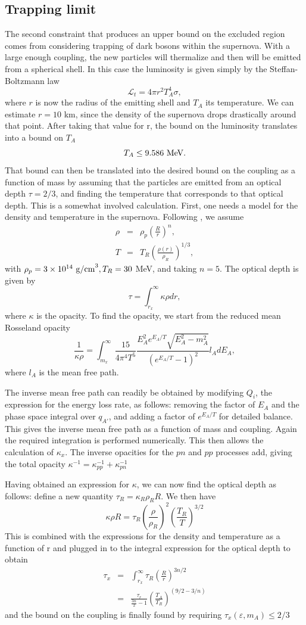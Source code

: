 \documentclass[nofootinbib,prd,superscriptaddress,twocolumn]{revtex4}
\newcommand{\beq}{\begin{equation}}
\newcommand{\eeq}{\end{equation}}
\newcommand{\bea}{\begin{eqnarray}}
\newcommand{\eea}{\end{eqnarray}}
\newcommand{\qa}{q_{A'}}
\begin{document}
\subsection{Trapping limit}
The second constraint that produces an upper bound on the excluded region comes from considering trapping of dark bosons within the supernova. With a large enough coupling, the new particles will thermalize and then will be emitted from a spherical shell.  In this case the luminosity is given simply by the Steffan-Boltzmann law
\beq
\mathcal{L}_t  = 4\pi r^2 T_A^4 \sigma,
\eeq
where $ r $ is now the radius of the emitting shell and $ T_A $ its temperature. We can estimate $ r = 10$ km, since the density of the supernova drops drastically around that point. After taking that value for r, the bound on the luminosity translates into a bound on $ T_A $ 
\beq
T_A \le 9.586\rm\ MeV.
\eeq
That bound can then be translated into the desired bound on the coupling as a function of mass by assuming that the particles are emitted from an optical depth $ \tau = 2/3 $, and finding the temperature that corresponds to that optical depth. This is a somewhat involved calculation.
First, one needs a model for the density and temperature in the supernova. Following \cite{dent_etal12}, we assume 
\bea
\rho &=& \rho_p \left(\frac{R}{r}\right)^n,\\
T &=& T_R \left(\frac{\rho(r)}{\rho_R}\right)^{1/3},
\eea
with $  \rho_p  = 3\times10^{14}\ {\rm g/cm}^3, T_R = 30$ MeV, and taking $ n = 5 $. The optical depth is given by 
\beq
\tau = \int_{r_x}^{\infty} \kappa \rho dr,
\eeq
where $ \kappa$ is the opacity.  To find the opacity, we start from the reduced mean Rosseland opacity 
\beq
\frac{1}{\kappa \rho} = \int_{m_x}^{\infty} \frac{15}{4 \pi^4 T^5} \frac{E_A^2 e^{E_A/T} \sqrt{E_A^2 - m_A^2}}{(e^{E_A/T}-1)^2} l_A dE_A,
\eeq
where $ l_A $ is the mean free path. 
	
The inverse mean free path can readily be obtained by modifying $ Q_i $, the expression for the energy loss rate, as follows: removing the factor of $ E_A $ and the phase space integral over $ \qa $, and adding a factor of $ e^{E_A/T} $ for detailed balance. This gives the inverse mean free path as a function of mass and coupling. Again the required integration is performed numerically. This then allows the calculation of $ \kappa_x $. The inverse opacities for the $pn$ and $pp$ processes add, giving the total opacity $ \kappa^{-1} = \kappa_{pp}^{-1} + \kappa_{pn}^{-1} $
	
Having obtained an expression for $ \kappa $, we can now find the optical depth as follows: define a new quantity $ \tau_R = \kappa_R \rho_R R $. We then have 
\beq \kappa \rho R = \tau_R (\frac{\rho}{\rho_R})^2 (\frac{T_R}{T})^{3/2}  \eeq
This is combined with the expressions for the density and temperature as a function of r and plugged in to the integral expression for the optical depth to obtain 
\bea \tau_x &=& \int_{r_x}^{\infty} \tau_R (\frac{R}{r})^{3n/2} \\
 &=& \frac{\tau_r}{\frac{3n}{2}-1} (\frac{T_A}{T_R})^{(9/2-3/n)} \eea
and the bound on the coupling is finally found by requiring  $ \tau_x(\varepsilon,m_A) \le 2/3 $
	
\end{document}
